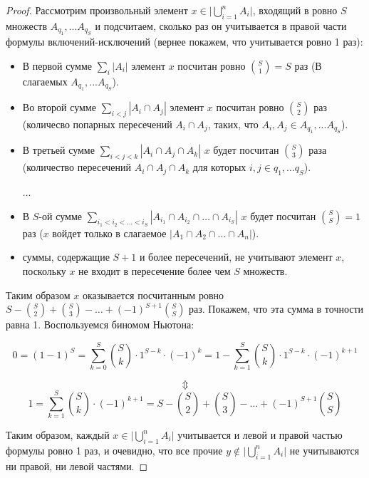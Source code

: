 \documentclass[a4paper,12pt]{article}
\begin{document}
 	\begin{proof}
	 	Рассмотрим произвольный элемент $x \in \biggl | \bigcup_{i=1}^{n}A_i \biggl |$, входящий в ровно $S$ множеств $A_{q_1}, ... A_{q_S}$ и подсчитаем, сколько раз он учитывается в правой части формулы включений-исключений (вернее покажем, что учитывается ровно 1 раз):
	 		\begin{itemize}
	 			\item В первой сумме $\sum_{i} | A_i |$ элемент  $x$ посчитан ровно ${S \choose 1} = S$ раз (В слагаемых $A_{q_1}, ... A_{q_S}$).

	 			\item Во второй сумме $\sum_{i<j} | A_i \cap A_j |$ элемент $x$ посчитан ровно ${S \choose 2}$ раз (количесво попарных пересечений $A_i \cap A_j$, таких, что $A_i, A_j \in A_{q_1}, ... A_{q_S}$).

	 			\item В третьей сумме $\sum_{i<j<k} | A_i \cap A_j \cap A_k |$ $x$ будет посчитан ${S \choose 3}$ раза (количество пересечений $A_i \cap A_j \cap A_k$ для которых $i, j \in q_1, \ldots q_S$).

	 			...

	 			\item В $S$-ой сумме $\sum_{i_1<i_2<\ldots<i_S} | A_{i_1} \cap A_{i_2} \cap \ldots \cap A_{i_S} |$
	 			$x$ будет посчитан ${S \choose S} = 1$  раз ($x$ войдет только в слагаемое $| A_1 \cap A_2 \cap \ldots \cap A_n |$).

	 			\item суммы, содержащие $S + 1$ и более пересечений, не учитывают элемент $x$, поскольку $x$ не входит в пересечение более чем $S$ множеств.
	 		\end{itemize}

	 		Таким образом $x$ оказывается посчитанным ровно $S - {S \choose 2} + {S \choose 3} - \ldots + (-1)^{S + 1} {S \choose S}$ раз. Покажем, что эта сумма в точности равна 1. Воспользуемся биномом Ньютона:

	 		$$0 = (1 - 1)^S =
	 		\sum_{k = 0}^{S} {S \choose k} \cdot 1^{S - k} \cdot (-1)^{k} =
	 		1 - \sum_{k = 1}^{S} {S \choose k} \cdot 1^{S - k} \cdot (-1)^{k + 1}$$

	 		$$\Updownarrow$$
	 		$$1 = \sum_{k = 1}^{S} {S \choose k} \cdot (-1)^{k + 1} =
	 		S - {S \choose 2} + {S \choose 3} - \ldots + (-1)^{S + 1} {S \choose S}$$

	 		Таким образом, каждый $x \in \biggl | \bigcup_{i=1}^{n}A_i \biggl |$ учитывается и левой и правой частью формулы ровно 1 раз, и очевидно, что все прочие $y \notin \biggl | \bigcup_{i=1}^{n}A_i \biggl |$ не учитываются ни правой, ни левой частями.
 	\end{proof}
\end{document}
